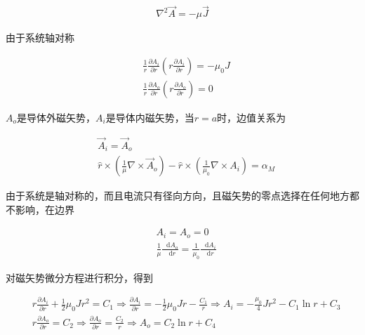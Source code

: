 \documentclass{article}
\newcommand*{\md}{\mathop{}\!\mathrm{d}}
\newcommand*{\Jmath}{J}
\begin{document}
\begin{equation*}
  \begin{aligned}
    \nabla^2 \vec{A} = - \mu \vec{\Jmath}
  \end{aligned}
\end{equation*}

由于系统轴对称

\begin{equation*}
  \begin{aligned}
    & \frac{1}{r} \frac{\partial A_i}{\partial r} \left( r \frac{\partial A_{i}}{\partial r} \right) = - \mu_0 J \\
    & \frac{1}{r} \frac{\partial A_o}{\partial r} \left( r \frac{\partial A_{o}}{\partial r} \right) = 0
  \end{aligned}
\end{equation*}

$A_o$是导体外磁矢势，$A_i$是导体内磁矢势，当$r=a$时，边值关系为

\begin{equation*}
  \begin{aligned}
    & \vec{A}_i = \vec{A}_o \\
    & \hat{r} \times \left( \frac{1}{\mu} \nabla \times \vec{A}_o \right) - \hat{r} \times \left( \frac{1}{\mu_{0}} \nabla \times A_i \right) = \alpha_M
  \end{aligned}
\end{equation*}

由于系统是轴对称的，而且电流只有径向方向，且磁矢势的零点选择在任何地方都不影响，在边界

\begin{equation*}
  \begin{aligned}
    & A_i = A_o = 0 \\
    & \frac{1}{\mu} \frac{\md A_{o}}{\md r} = \frac{1}{\mu_{0}} \frac{\md A_{i}}{\md r}
  \end{aligned}
\end{equation*}

对磁矢势微分方程进行积分，得到

\begin{equation*}
  \begin{aligned}
    & r \frac{\partial A_{i}}{\partial r} + \frac{1}{2} \mu_0 J r^2 = C_1
    \Rightarrow \frac{\partial A_{i}}{\partial r} = - \frac{1}{2} \mu_0 J r - \frac{C_{1}}{r}
    \Rightarrow A_i = - \frac{\mu_0}{4} J r^2 - C_1 \ln r + C_3
    \\
    & r \frac{\partial A_{o}}{\partial r} = C_2
    \Rightarrow \frac{\partial A_{o}}{\partial r} = \frac{C_{2}}{r}
    \Rightarrow A_o = C_2 \ln r + C_4
  \end{aligned}
\end{equation*}
\end{document}
